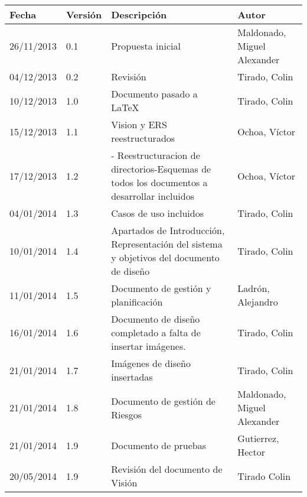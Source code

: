 \begin{tabular}{|p{3cm}|p{1.5cm}|p{3.5cm}|p{4cm}|}
    \hline
    \textbf{Fecha} & \textbf{Versión} & \textbf{Descripción} & \textbf{Autor} \\
    \hline
    26/11/2013 & 0.1 & Propuesta inicial & Maldonado, Miguel Alexander \\
    \hline
    04/12/2013 & 0.2 & Revisión & Tirado, Colin \\
    \hline
    10/12/2013 & 1.0 & Documento pasado a LaTeX & Tirado, Colin \\
    \hline
    15/12/2013 & 1.1 & Vision y ERS reestructurados & Ochoa, Víctor \\
    \hline
    17/12/2013 & 1.2 & - Reestructuracion de directorios\newline -Esquemas de todos los documentos a desarrollar incluidos & Ochoa, Víctor \\
    \hline
    04/01/2014 & 1.3 & Casos de uso incluidos & Tirado, Colin \\
    \hline
    10/01/2014 & 1.4 & Apartados de Introducci\'on, Representaci\'on del sistema y objetivos del documento de dise\~no & Tirado, Colin \\
    \hline
    11/01/2014 & 1.5 & Documento de gestión y planificación & Ladrón, Alejandro \\
    \hline
    16/01/2014 & 1.6 & Documento de dise\~no completado a falta de insertar im\'agenes. & Tirado, Colin \\
    \hline
    21/01/2014 & 1.7 & Imágenes de diseño insertadas & Tirado, Colin \\
    \hline
    21/01/2014 & 1.8 & Documento de gestión de Riesgos & Maldonado, Miguel Alexander\\
    \hline
    21/01/2014 & 1.9 & Documento de pruebas & Gutierrez, Hector \\
    \hline
    20/05/2014 & 1.9 & Revisión del documento de Visión & Tirado Colin \\
    \hline
\end{tabular}

